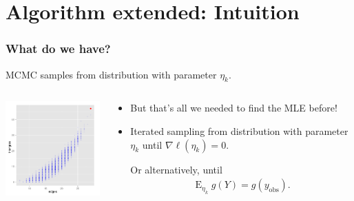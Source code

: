\documentclass[ 10pt]{beamer}
\DeclareMathOperator{\E}{E}
\newcommand{\etaLCM}{\hat{\eta}_{\textrm{LCM}}}
\newcommand{\yobs}{y_{\text{obs}}}
\begin{document}
\section{Algorithm extended: Intuition}
\frame
{
\frametitle{What do we have?}
MCMC samples from distribution with parameter $\eta_k$.  

\vspace{1ex}

\begin{columns}[t]
\begin{column}[T]{0.4\textwidth}
\includegraphics[width=2in]{MCsample-bare}
\end{column}

\begin{column}[r]{0.6\textwidth}
\pause

\begin{itemize}
\item But that's all we needed to find the MLE before! 


\item Iterated sampling from distribution with parameter $\eta_k$ until $\nabla \ell(\eta_k) = 0$.
\vspace{1mm}

Or alternatively, until
\begin{align*}
	\E_{\eta_k} g(Y) = g(\yobs).
\end{align*}

\end{itemize}
\end{column}
\end{columns}
}
\end{document}
